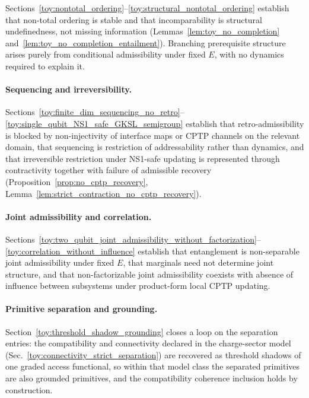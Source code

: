 \documentclass[aps,prx,onecolumn,11pt]{revtex4-2}
\theoremstyle{plain}
\theoremstyle{definition}
\theoremstyle{remark}
\begin{document}
Sections~\ref{toy:nontotal_ordering}--\ref{toy:structural_nontotal_ordering}
establish that non-total ordering is stable and that incomparability is
structural undefinedness, not missing information
(Lemmas~\ref{lem:toy_no_completion}
and~\ref{lem:toy_no_completion_entailment}). Branching
prerequisite structure arises purely from conditional admissibility
under fixed \(E\), with no dynamics required to explain it.

\paragraph{Sequencing and irreversibility.}

Sections~\ref{toy:finite_dim_sequencing_no_retro}--\ref{toy:single_qubit_NS1_safe_GKSL_semigroup}
establish that retro-admissibility is blocked by non-injectivity of
interface maps or CPTP channels on the relevant domain, that sequencing
is restriction of addressability rather than dynamics, and that
irreversible restriction under NS1-safe updating is represented through
contractivity together with failure of admissible recovery
(Proposition~\ref{prop:no_cptp_recovery},
Lemma~\ref{lem:strict_contraction_no_cptp_recovery}).

\paragraph{Joint admissibility and correlation.}

Sections~\ref{toy:two_qubit_joint_admissibility_without_factorization}--\ref{toy:correlation_without_influence}
establish that entanglement is non-separable joint admissibility under
fixed \(E\), that marginals need not determine joint structure, and that
non-factorizable joint admissibility coexists with absence of influence
between subsystems under product-form local CPTP updating.

\paragraph{Primitive separation and grounding.}

Section~\ref{toy:threshold_shadow_grounding} closes a loop on the
separation entries: the compatibility and connectivity declared in the
charge-sector model
(Sec.~\ref{toy:connectivity_strict_separation}) are recovered
as threshold shadows of one graded access functional, so within that
model class the separated primitives are also grounded primitives, and
the compatibility coherence inclusion holds by construction.
\end{document}
